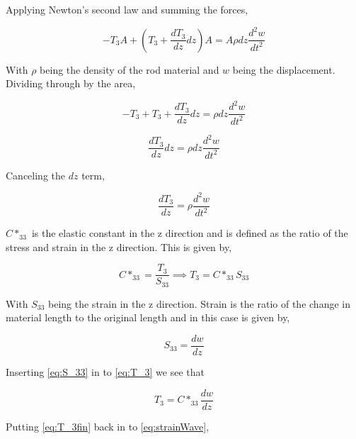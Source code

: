 Applying Newton's second law and summing the forces,

\begin{equation}
-T_3A + (T_3 + \frac{dT_3}{dz}dz)A = A\rho dz \frac{d^2w}{dt^2}
\end{equation}


With $\rho$ being the density of the rod material and $w$ being the displacement. Dividing through by the area,

\begin{equation}
-T_3 + T_3 + \frac{dT_3}{dz}dz = \rho dz \frac{d^2w}{dt^2}
\end{equation}

\begin{equation}
\frac{dT_3}{dz}dz = \rho dz \frac{d^2w}{dt^2}
\end{equation}

Canceling the $dz$ term,

\begin{equation}
\frac{dT_3}{dz} = \rho \frac{d^2w}{dt^2}
\label{eq:strainWave}
\end{equation}

$C*_{33}$ is the elastic constant in the z direction and is defined as the ratio of the stress and strain in the z direction. This is given by,

\begin{equation}
C*_{33} = \frac{T_3}{S_{33}} \implies T_3 = C*_{33}S_{33}
\label{eq:T_3}
\end{equation}


With $S_{33}$ being the strain in the z direction. Strain is the ratio of the change in material length to the original length and in this case is given by,

\begin{equation}
S_{33} = \frac{dw}{dz}
\label{eq:S_33}
\end{equation}

Inserting \ref{eq:S_33} in to \ref{eq:T_3} we see that

\begin{equation}
T_3 = C*_{33}\frac{dw}{dz}
\label{eq:T_3fin}
\end{equation}

Putting \ref{eq:T_3fin} back in to \ref{eq:strainWave},


